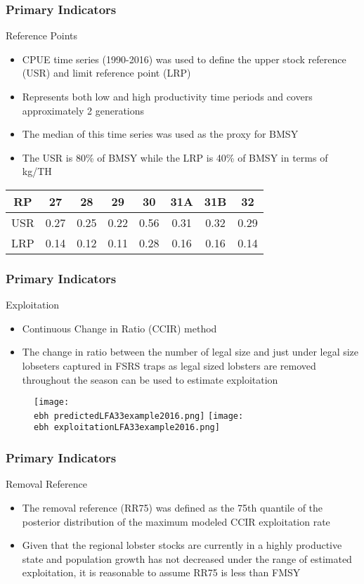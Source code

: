 \documentclass{beamer}
\newcommand{\ebh}{\string~/bio.data/bio.lobster/figures/Assessment/LFA2732/} %
\begin{document}
\begin{frame}
\frametitle{Primary Indicators}
Reference Points
\begin{itemize}
\item CPUE time series (1990-2016) was used to define the upper stock reference (USR) and limit reference point (LRP) 
\item Represents both low and high productivity time periods and covers approximately 2 generations 
\item The median of this time series was used as the proxy for BMSY 
\item The USR is 80\% of BMSY while the LRP is 40\% of BMSY in terms of kg/TH
\end{itemize}
\centering
\begin{tabular}{|c|c|c|c|c|c|c|c|}
\hline
RP & 27 & 28 & 29 & 30 & 31A & 31B & 32 \\
\hline
USR & 0.27 & 0.25 & 0.22 & 0.56 & 0.31 & 0.32 & 0.29 \\
\hline
LRP & 0.14 & 0.12  & 0.11  & 0.28  & 0.16  & 0.16  & 0.14 \\
\hline
\end{tabular}
\end{frame}


\begin{frame}
\frametitle{Primary Indicators}
Exploitation
\begin{itemize}
\item Continuous Change in Ratio (CCIR) method
\item The change in ratio between the number of legal size and just under legal size lobseters captured in FSRS traps as legal sized lobsters are removed throughout the season can be used to estimate exploitation
\end{itemize}
\begin{figure}
        \begin{center}
            \texttt{[image: \\ebh predictedLFA33example2016.png]}
            \texttt{[image: \\ebh exploitationLFA33example2016.png]}
        \end{center}
    \end{figure}
\end{frame}


\begin{frame}
\frametitle{Primary Indicators}
Removal Reference
\begin{itemize}
    \setlength\itemsep{2em}
\item The removal reference (RR75) was defined as the 75th quantile of the posterior distribution of the maximum modeled CCIR exploitation rate
\item Given that the regional lobster stocks are currently in a highly productive state and population growth has not decreased under the range of estimated exploitation, it is reasonable to assume RR75 is less than FMSY 
\end{itemize}
\end{frame}
\end{document}
